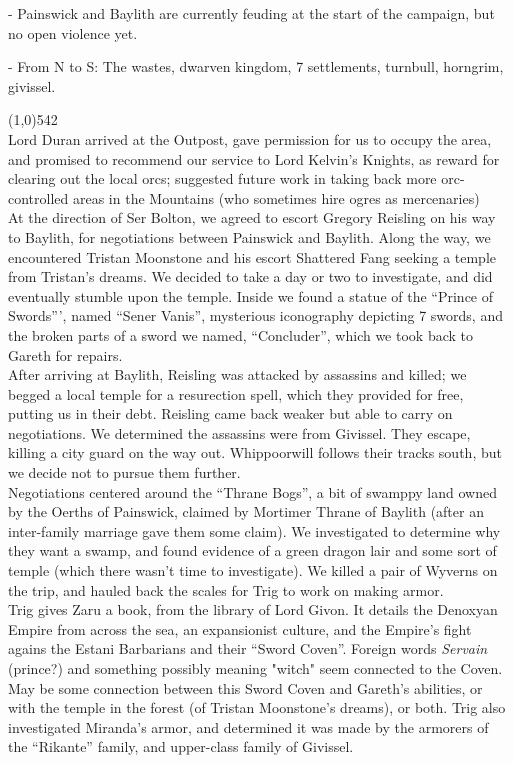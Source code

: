 \documentclass[letterpaper]{article}
\newcommand{\fullline}{\noindent\line(1,0){542} \\}
\begin{document}
\noindent - Painswick and Baylith are currently feuding at the start of the campaign, but no open violence yet.

\noindent - From N to S: The wastes, dwarven kingdom, 7 settlements, turnbull, horngrim, givissel.

\vspace{-0.75em}
\fullline
\noindent Lord Duran arrived at the Outpost, gave permission for us to occupy the area, and promised to recommend our service to Lord Kelvin's Knights, as reward for clearing out the local orcs; suggested future work in taking back more orc-controlled areas in the Mountains (who sometimes hire ogres as mercenaries)\\

\noindent At the direction of Ser Bolton, we agreed to escort Gregory Reisling on his way to Baylith, for negotiations between Painswick and Baylith.  Along the way, we encountered Tristan Moonstone and his escort Shattered Fang seeking a temple from Tristan's dreams. We decided to take a day or two to investigate, and did eventually stumble upon the temple.  Inside we found a statue of the ``Prince of Swords''', named ``Sener Vanis'', mysterious iconography depicting 7 swords, and the broken parts of a sword we named, ``Concluder'', which we took back to Gareth for repairs.\\

\noindent After arriving at Baylith, Reisling was attacked by assassins and killed; we begged a local temple for a resurection spell, which they provided for free, putting us in their debt.  Reisling came back weaker but able to carry on negotiations.  We determined the assassins were from Givissel.  They escape, killing a city guard on the way out.  Whippoorwill follows their tracks south, but we decide not to pursue them further.\\

\noindent Negotiations centered around the ``Thrane Bogs'', a bit of swamppy land owned by the Oerths of Painswick, claimed by Mortimer Thrane of Baylith (after an inter-family marriage gave them some claim).  We investigated to determine why they want a swamp, and found evidence of a green dragon lair and some sort of temple (which there wasn't time to investigate).  We killed a pair of Wyverns on the trip, and hauled back the scales for Trig to work on making armor.\\

\noindent Trig gives Zaru a book, from the library of Lord Givon.  It details the Denoxyan Empire from across the sea, an expansionist culture, and the Empire's fight agains the Estani Barbarians and their ``Sword Coven''. Foreign words \emph{Servain} (prince?) and something possibly meaning "witch" seem connected to the Coven.  May be some connection between this Sword Coven and Gareth's abilities, or with the temple in the forest (of Tristan Moonstone's dreams), or both.  Trig also investigated Miranda's armor, and determined it was made by the armorers of the ``Rikante'' family, and upper-class family of Givissel.\\
\end{document}
